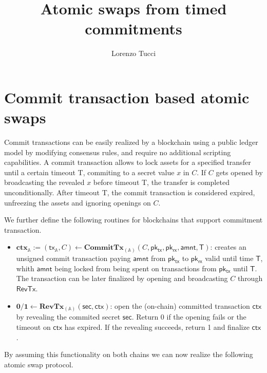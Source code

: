 \documentclass{article}      	%
\begin{document}
         
\author{Lorenzo Tucci}
\title{Atomic swaps from timed commitments}

\maketitle

\tableofcontents
\newpage

\section{Commit transaction based atomic swaps}

Commit transactions can be easily realized by a blockchain using a public ledger model by modifying consensus rules, and require no additional scripting capabilities. 
A commit transaction allows to lock assets for a specified transfer until a certain timeout T, commiting to a secret value $x$ in $C$. If $C$ gets opened by broadcasting the revealed $x$ before timeout T, the transfer is completed unconditionally. 
After timeout T, the commit transaction is considered expired, unfreezing the assets and ignoring openings on $C$.

We further define the following routines for blockchains that support commitment transaction.
\begin{itemize}[topsep=0pt, itemsep=0pt, leftmargin=2em]
	\item $\mathbf{ctx}_{\mathbb{A}} := (\mathsf{tx_{\mathbb{A}}}, C) \gets \mathbf{CommitTx}_{(\mathbb{A})}(C, \mathsf{pk_{tx}}, \mathsf{pk_{rx}}, \mathsf{amnt}, \mathsf{T})$: creates an unsigned commit transaction paying $\mathsf{amnt}$ from $\mathsf{pk_{tx}}$ to $\mathsf{pk_{rx}}$ valid until time $\mathsf{T}$, whith  $\mathsf{amnt}$ being locked from being spent on transactions from $\mathsf{pk_{tx}}$ until $\mathsf{T}$. The transaction can be later finalized by opening and broadcasting $C$ through $\mathsf{RevTx}$.
    \item $ \mathbf{0/1} \gets \mathbf{RevTx}_{(\mathbb{A})}(\mathsf{sec}, \mathsf{ctx})$: open the (on-chain) committed transaction $\mathsf{ctx}$ by revealing the commited secret $\mathsf{sec}$. Return 0 if the opening fails or the timeout on $\mathsf{ctx}$ has expired. If the revealing succeeds, return 1 and finalize $\mathsf{ctx}$.
\end{itemize}

By assuming this functionality on both chains we can now realize the following atomic swap protocol.
\end{document}
